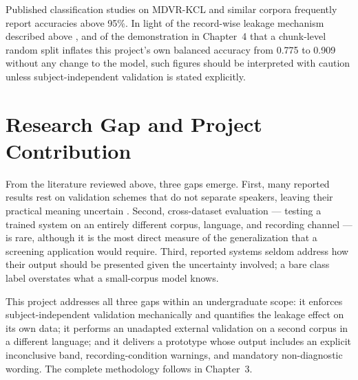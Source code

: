 Published classification studies on MDVR-KCL and similar corpora
frequently report accuracies above 95\%. In light of the record-wise
leakage mechanism described above \cite{saeb2017}, and of the
demonstration in Chapter~4 that a chunk-level random split inflates
this project's own balanced accuracy from 0.775 to 0.909 without any
change to the model, such figures should be interpreted with caution
unless subject-independent validation is stated explicitly.

\section{Research Gap and Project Contribution}

From the literature reviewed above, three gaps emerge. First, many
reported results rest on validation schemes that do not separate
speakers, leaving their practical meaning uncertain \cite{saeb2017}. Second, cross-dataset evaluation --- testing a trained
system on an entirely different corpus, language, and recording channel
--- is rare, although it is the most direct measure of the
generalization that a screening application would require. Third,
reported systems seldom address how their output should be presented
given the uncertainty involved; a bare class label overstates what a
small-corpus model knows.

This project addresses all three gaps within an undergraduate scope:
it enforces subject-independent validation mechanically and quantifies
the leakage effect on its own data; it performs an unadapted external
validation on a second corpus in a different language; and it delivers
a prototype whose output includes an explicit inconclusive band,
recording-condition warnings, and mandatory non-diagnostic wording.
The complete methodology follows in Chapter~3.

